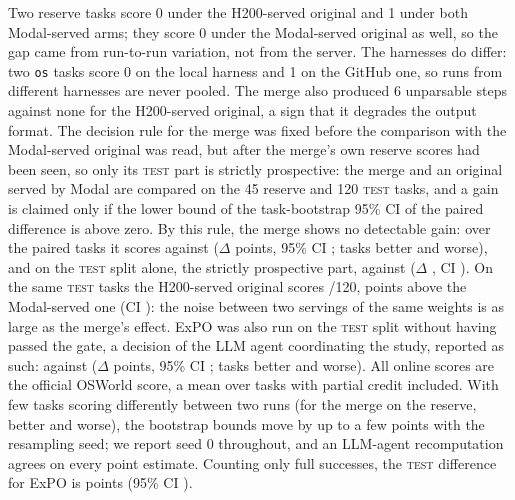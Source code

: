 Two reserve tasks score 0 under the H200-served original and 1 under both Modal-served arms; they score 0 under the Modal-served original as well, so the gap came from run-to-run variation, not from the server. The harnesses do differ: two \texttt{os} tasks score 0 on the local harness and 1 on the GitHub one, so runs from different harnesses are never pooled. The merge also produced 6 unparsable steps against none for the H200-served original, a sign that it degrades the output format. %
The decision rule for the merge was fixed before the comparison with the Modal-served original was read, but after the merge's own reserve scores had been seen, so only its \textsc{test} part is strictly prospective: the merge and an original served by Modal are compared on the 45 reserve and 120 \textsc{test} tasks, and a gain is claimed only if the lower bound of the task-bootstrap 95\% CI of the paired difference is above zero. By this rule, the merge shows no detectable gain: over the \onAllCuaN{} paired tasks it scores \onAllCuaArm{} against \onAllCuaOrig{} ($\Delta$ \onAllCuaDelta{} points, 95\% CI \onAllCuaCi; \onAllCuaDisc{} tasks better and worse), and on the \textsc{test} split alone, the strictly prospective part, \onTestCuaArm{} against \onTestCuaOrig{} ($\Delta$ \onTestCuaDelta, CI \onTestCuaCi). On the same \textsc{test} tasks the H200-served original scores \onTestOrigScore/120, \onTestNoiseServerDelta{} points above the Modal-served one (CI \onTestNoiseServerCi): the noise between two servings of the same weights is as large as the merge's effect. %
ExPO was also run on the \textsc{test} split without having passed the gate, a decision of the LLM agent coordinating the study, reported as such: \onTestExpoArm{} against \onTestExpoOrig{} ($\Delta$ \onTestExpoDelta{} points, 95\% CI \onTestExpoCi; \onTestExpoDisc{} tasks better and worse). All online scores are the official OSWorld score, a mean over tasks with partial credit included. With few tasks scoring differently between two runs (for the merge on the reserve, \onReserveCuaDisc{} better and worse), the bootstrap bounds move by up to a few points with the resampling seed; we report seed 0 throughout, and an LLM-agent recomputation agrees on every point estimate. Counting only full successes, the \textsc{test} difference for ExPO is \onTestExpoBinDelta{} points (95\% CI \onTestExpoBinCi). %
